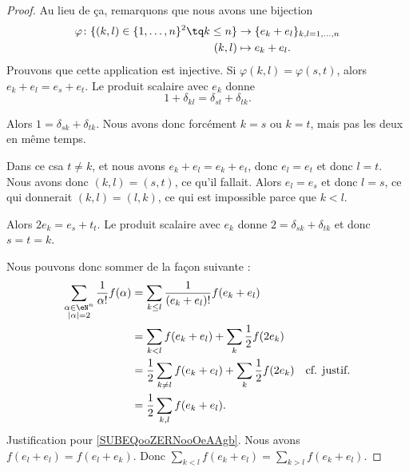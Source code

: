 \begin{proof}
	Au lieu de ça, remarquons que nous avons une bijection
	\begin{equation}
		\begin{aligned}
			\varphi\colon \{ (k,l)\in \{ 1,\ldots,n \}^2\tq k\leq n \} & \to \{ e_k+e_l \}_{k,l=1,\ldots,n} \\
			(k,l)                                                      & \mapsto e_k+e_l.
		\end{aligned}
	\end{equation}
	Prouvons que cette application est injective. Si \( \varphi(k,l)=\varphi(s,t)\), alors \( e_k+e_l=e_s+e_t\). Le produit scalaire avec \( e_k\) donne
	\begin{equation}
		1+\delta_{kl}=\delta_{st}+\delta_{tk}.
	\end{equation}
	\begin{subproof}
		\spitem[Si \( k<l\)]
		Alors \( 1=\delta_{sk}+\delta_{tk}\). Nous avons donc forcément \( k=s\) ou \( k=t\), mais pas les deux en même temps.
		\begin{subproof}
			\spitem[Si \( s=k\)]
			Dans ce csa \( t\neq k\), et nous avons \( e_k+e_l=e_k+e_t\), donc \( e_l=e_t\) et donc \( l=t\). Nous avons donc \( (k,l)=(s,t)\), ce qu'il fallait.
			\spitem[Si \( t=k\)]
			Alors \( e_l=e_s\) et donc \( l=s\), ce qui donnerait \( (k,l)=(l,k)\), ce qui est impossible parce que \( k<l\).
		\end{subproof}
		\spitem[Si \( k=l\)]
		Alors \( 2e_k=e_s+t_t\). Le produit scalaire avec \( e_k\) donne \( 2=\delta_{sk}+\delta_{tk}\) et donc \( s=t=k\).
	\end{subproof}
	Nous pouvons donc sommer de la façon suivante :
	\begin{subequations}
		\begin{align}
			\sum_{\substack{ \alpha\in \eN^n                                                                                     \\ | \alpha |=2 }  }\frac{1}{ \alpha!}f(\alpha)&=\sum_{k\leq l}\frac{1}{ (e_k+e_l)!}f(e_k+e_l)\\
			 & =\sum_{k<l}f(e_k+e_l)+\sum_k\frac{1}{ 2}f(2e_k)                                                                   \\
			 & =\frac{1}{ 2}\sum_{k\neq l}f(e_k+e_l)+\sum_k\frac{1}{ 2}f(2e_k) & \text{cf. justif.}		\label{SUBEQooZERNooOeAAgb} \\
			 & =\frac{1}{ 2}\sum_{k,l}f(e_k+e_l).
		\end{align}
	\end{subequations}
	Justification pour \eqref{SUBEQooZERNooOeAAgb}. Nous avons \( f(e_l+e_l)=f(e_l+e_k)\). Donc \( \sum_{k<l} f(e_k+e_l)=\sum_{k>l}f(e_k+e_l)\).
\end{proof}

